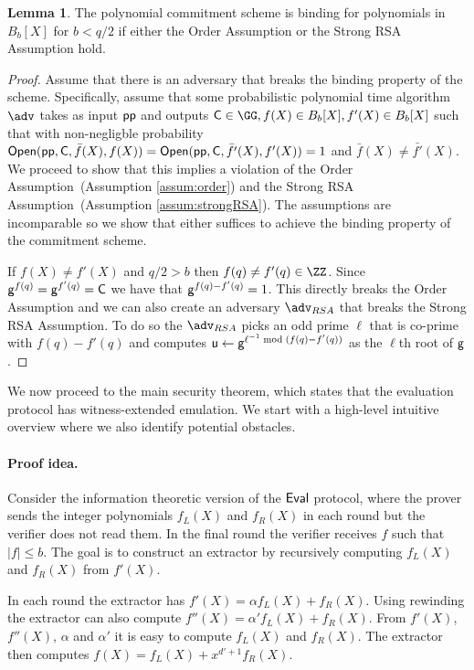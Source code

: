 \documentclass{article}
\theoremstyle{definition}
\newtheorem{lemma}{Lemma}
\begin{document}
\begin{lemma}
	The polynomial commitment scheme is binding for polynomials in $B_b[X]$ for $b<q/2$ if either the Order Assumption or the Strong RSA Assumption hold.
\end{lemma}
\begin{proof}
    Assume that there is an adversary that breaks the binding property of the scheme. Specifically, assume that some probabilistic polynomial time algorithm $\adv$ takes as input $\textsf{pp}$ and outputs $\gr{C} \in \GG, f(X) \in B_{b}[X], f'(X)\in B_{b}[X]$ such that with non-negligble probability $\textsf{{Open}}(\textsf{pp}, \mathsf{C}, \bar{f}(X), f(X)) = \textsf{{Open}}(\textsf{pp}, \mathsf{C}, \bar{f'}(X), f'(X)) = 1$ and $\bar{f}(X) \neq \bar{f'}(X)$. We proceed to show that this implies a violation of the Order Assumption~(Assumption \ref{assum:order}) and the Strong RSA Assumption~(Assumption \ref{assum:strongRSA}). The assumptions are incomparable so we show that either suffices to achieve the binding property of the commitment scheme.
    
	If $f(X)\neq f'(X)$ and $q/2>b$ then $f(q)\neq f'(q)\in \ZZ$. Since $\mathsf{g}^{f(q)}=\mathsf{g}^{f'(q)}=\mathsf{C}$ we have that $\mathsf{g}^{f(q)-f'(q)}=1$. This directly breaks the Order Assumption and we can also create an adversary $\adv_{RSA}$ that breaks the Strong RSA Assumption. To do so the $\adv_{RSA}$ picks an odd prime $\ell$ that is co-prime with $f(q)-f'(q)$ and computes $\mathsf{u}\gets \mathsf{g}^{\ell^{-1} \bmod (f(q)-f'(q))}$ as the $\ell$th root of $\mathsf{g}$.
\end{proof}


We now proceed to the main security theorem, which states that the evaluation protocol has witness-extended emulation. We start with a high-level intuitive overview where we also identify potential obstacles.

\paragraph{Proof idea.} Consider the information theoretic version of the $\textsf{{Eval}}$ protocol, where the prover sends the integer polynomials $f_L(X)$ and $f_R(X)$ in each round but the verifier does not read them.
In the final round the verifier receives $f$ such that $|f| \leq b$. The goal is to construct an extractor by recursively computing $f_L(X)$ and $f_R(X)$ from $f'(X)$.

In each round the extractor has $f'(X)=\alpha f_L(X)+ f_R(X)$. Using rewinding the extractor can also compute $f''(X)=\alpha' f_L(X)+ f_R(X)$. From $f'(X)$, $f''(X)$, $\alpha$ and $\alpha'$ it is easy to compute $f_L(X)$ and $f_R(X)$. The extractor then computes $f(X)=f_L(X)+x^{d'+1} f_R(X)$.
\end{document}
